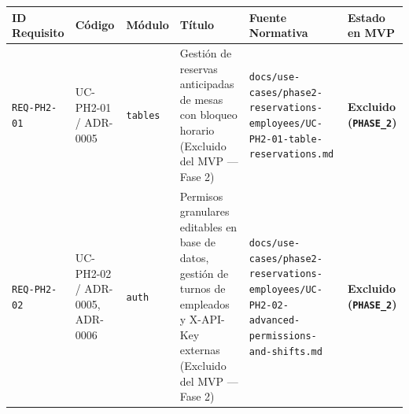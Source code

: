 \documentclass[10pt,a4paper]{article}
\newcounter{none}
\begin{document}
\begingroup\singlespacing\scriptsize\setlength{\parskip}{0pt}

{\def\LTcaptype{none} %
\begin{longtable}[]{@{}
  >{\raggedright\arraybackslash}p{}
  >{\raggedright\arraybackslash}p{}
  >{\raggedright\arraybackslash}p{}
  >{\raggedright\arraybackslash}p{}
  >{\raggedright\arraybackslash}p{}
  >{\raggedright\arraybackslash}p{}@{}}
\toprule\noalign{}
\begin{minipage}[b]{\linewidth}\raggedright
ID Requisito
\end{minipage} & \begin{minipage}[b]{\linewidth}\raggedright
Código
\end{minipage} & \begin{minipage}[b]{\linewidth}\raggedright
Módulo
\end{minipage} & \begin{minipage}[b]{\linewidth}\raggedright
Título
\end{minipage} & \begin{minipage}[b]{\linewidth}\raggedright
Fuente Normativa
\end{minipage} & \begin{minipage}[b]{\linewidth}\raggedright
Estado en MVP
\end{minipage} \\
\midrule\noalign{}
\endhead
\bottomrule\noalign{}
\endlastfoot
\texttt{REQ-{}\allowbreak{}PH2-{}\allowbreak{}01} & UC-PH2-01 / ADR-0005 & \texttt{tables} & Gestión de reservas anticipadas de mesas con bloqueo horario (Excluido del MVP --- Fase 2) & \texttt{docs/\allowbreak{}use-{}\allowbreak{}cases/\allowbreak{}phase2-{}\allowbreak{}reservations-{}\allowbreak{}employees/\allowbreak{}UC-{}\allowbreak{}PH2-{}\allowbreak{}01-{}\allowbreak{}table-{}\allowbreak{}reservations.\allowbreak{}md} & \textbf{Excluido (\texttt{PHASE\_\allowbreak{}2})} \\
\texttt{REQ-{}\allowbreak{}PH2-{}\allowbreak{}02} & UC-PH2-02 / ADR-0005, ADR-0006 & \texttt{auth} & Permisos granulares editables en base de datos, gestión de turnos de empleados y X-API-Key externas (Excluido del MVP --- Fase 2) & \texttt{docs/\allowbreak{}use-{}\allowbreak{}cases/\allowbreak{}phase2-{}\allowbreak{}reservations-{}\allowbreak{}employees/\allowbreak{}UC-{}\allowbreak{}PH2-{}\allowbreak{}02-{}\allowbreak{}advanced-{}\allowbreak{}permissions-{}\allowbreak{}and-{}\allowbreak{}shifts.\allowbreak{}md} & \textbf{Excluido (\texttt{PHASE\_\allowbreak{}2})} \\
\end{longtable}
}
\end{document}
